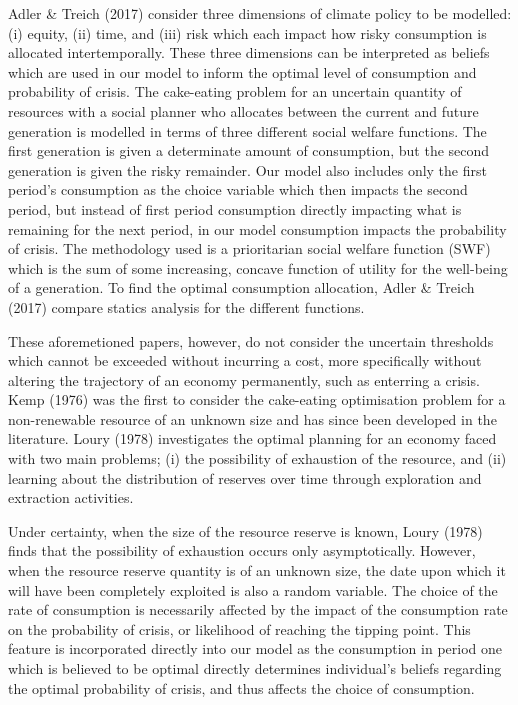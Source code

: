 \documentclass[11pt,preprint, authoryear]{elsarticle}
\numberwithin{equation}{section}
\numberwithin{figure}{section}
\numberwithin{table}{section}
\begin{document}
Adler \& Treich (2017) consider three dimensions of climate policy to be
modelled: (i) equity, (ii) time, and (iii) risk which each impact how
risky consumption is allocated intertemporally. These three dimensions
can be interpreted as beliefs which are used in our model to inform the
optimal level of consumption and probability of crisis. The cake-eating
problem for an uncertain quantity of resources with a social planner who
allocates between the current and future generation is modelled in terms
of three different social welfare functions. The first generation is
given a determinate amount of consumption, but the second generation is
given the risky remainder. Our model also includes only the first
period's consumption as the choice variable which then impacts the
second period, but instead of first period consumption directly
impacting what is remaining for the next period, in our model
consumption impacts the probability of crisis. The methodology used is a
prioritarian social welfare function (SWF) which is the sum of some
increasing, concave function of utility for the well-being of a
generation. To find the optimal consumption allocation, Adler \& Treich
(2017) compare statics analysis for the different functions.

These aforemetioned papers, however, do not consider the uncertain
thresholds which cannot be exceeded without incurring a cost, more
specifically without altering the trajectory of an economy permanently,
such as enterring a crisis. Kemp (1976) was the first to consider the
cake-eating optimisation problem for a non-renewable resource of an
unknown size and has since been developed in the literature. Loury
(1978) investigates the optimal planning for an economy faced with two
main problems; (i) the possibility of exhaustion of the resource, and
(ii) learning about the distribution of reserves over time through
exploration and extraction activities.

Under certainty, when the size of the resource reserve is known, Loury
(1978) finds that the possibility of exhaustion occurs only
asymptotically. However, when the resource reserve quantity is of an
unknown size, the date upon which it will have been completely exploited
is also a random variable. The choice of the rate of consumption is
necessarily affected by the impact of the consumption rate on the
probability of crisis, or likelihood of reaching the tipping point. This
feature is incorporated directly into our model as the consumption in
period one which is believed to be optimal directly determines
individual's beliefs regarding the optimal probability of crisis, and
thus affects the choice of consumption.
\end{document}
